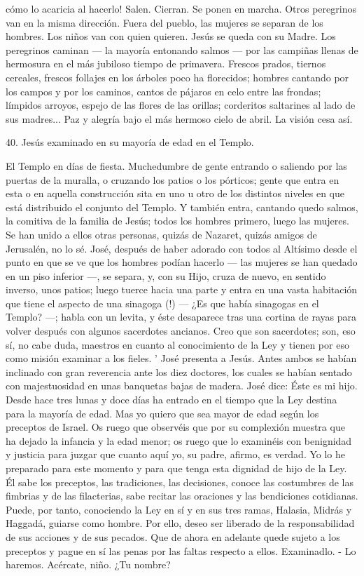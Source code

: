 \documentclass[12pt]{book} %
\begin{document}
cómo lo acaricia al hacerlo! 
Salen. Cierran. Se ponen en marcha. Otros peregrinos van en la misma dirección. Fuera del pueblo, las mujeres se separan de los hombres. Los niños van con quien quieren. Jesús se queda con su Madre. 
Los peregrinos caminan — la mayoría entonando salmos — por las campiñas llenas de hermosura en el más jubiloso 
tiempo de primavera. Frescos prados, tiernos cereales, frescos follajes en los árboles poco ha florecidos; hombres cantando por los campos y por los caminos, cantos de pájaros en celo entre las frondas; límpidos arroyos, espejo de las flores de las orillas; corderitos saltarines al lado de sus madres... Paz y alegría bajo el más hermoso cielo de abril. La visión cesa así. 
 
 
40. 
Jesús examinado en su mayoría de edad en el Templo. 
 
El Templo en días de fiesta. Muchedumbre de gente entrando o saliendo por las puertas de la muralla, o cruzando los 
patios o los pórticos; gente que entra en esta o en aquella construcción sita en uno u otro de los distintos niveles en que está distribuido el conjunto del Templo. 
Y también entra, cantando quedo salmos, la comitiva de la familia de Jesús; todos los hombres primero, luego las 
mujeres. Se han unido a ellos otras personas, quizás de Nazaret, quizás amigos de Jerusalén, no lo sé. 
José, después de haber adorado con todos al Altísimo desde el punto en que se ve que los hombres podían hacerlo — 
las mujeres se han quedado en un piso inferior —, se separa, y, con su Hijo, cruza de nuevo, en sentido inverso, unos patios; luego tuerce hacia una parte y entra en una vasta habitación que tiene el aspecto de una sinagoga (!) — ¿Es que había sinagogas en el Templo? —; habla con un levita, y éste desaparece tras una cortina de rayas para volver después con algunos sacerdotes ancianos. Creo que son sacerdotes; son, eso sí, no cabe duda, maestros en cuanto al conocimiento de la Ley y tienen por eso como misión examinar a los fieles.        ' 
José presenta a Jesús. Antes ambos se habían inclinado con gran reverencia ante los diez doctores, los cuales se habían sentado con majestuosidad en unas banquetas bajas de madera. José dice: 
Éste es mi hijo. Desde hace tres lunas y doce días ha entrado en el tiempo que la Ley destina para la mayoría de edad. Mas yo quiero que sea mayor de edad según los preceptos de Israel. Os ruego que observéis que por su complexión muestra que ha dejado la infancia y la edad menor; os ruego que lo examinéis con benignidad y justicia para juzgar que cuanto aquí yo, su padre, afirmo, es verdad. Yo lo he preparado para este momento y para que tenga esta dignidad de hijo de la Ley. Él sabe los preceptos, las tradiciones, las decisiones, conoce las costumbres de las fimbrias y de las filacterias, sabe recitar las oraciones y las bendiciones cotidianas. Puede, por tanto, conociendo la Ley en sí y en sus tres ramas, Halasia, Midrás y Haggadá, guiarse como hombre. Por ello, deseo ser liberado de la responsabilidad de sus acciones y de sus pecados. Que de ahora en adelante quede sujeto a los preceptos y pague en sí las penas por las faltas respecto a ellos. Examinadlo. - Lo haremos. Acércate, niño. ¿Tu nombre? 
\end{document}

